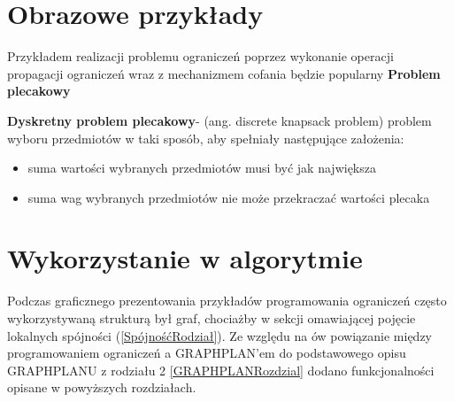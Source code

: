 \section{Obrazowe przykłady}
    Przykładem realizacji problemu ograniczeń poprzez wykonanie operacji propagacji ograniczeń wraz z mechanizmem cofania będzie popularny \textbf{Problem plecakowy}
    \begin{example}
        \textbf{Dyskretny problem plecakowy}- (ang. discrete knapsack problem) problem wyboru przedmiotów w taki sposób, aby spełniały następujące założenia:
        \begin{itemize}
            \item suma wartości wybranych przedmiotów musi być jak największa 
            \item suma wag wybranych przedmiotów nie może przekraczać wartości plecaka
        \end{itemize}

    \end{example}

\section{Wykorzystanie w algorytmie}

    Podczas graficznego prezentowania przykładów programowania ograniczeń często wykorzystywaną strukturą był graf, chociażby w sekcji omawiającej 
    pojęcie lokalnych spójności (\ref{SpójnośćRodział}). Ze względu na ów powiązanie między programowaniem ograniczeń a GRAPHPLAN'em do podstawowego opisu GRAPHPLANU z rodziału 2 
    \ref{GRAPHPLANRozdzial} dodano funkcjonalności opisane w powyższych rozdziałach. 

